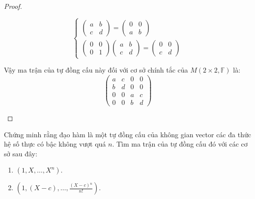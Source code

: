 \documentclass[class=linearalgebra,crop=false]{standalone}
\begin{document}
\begin{proof}
\begin{enumerate}[label = (\alph*)]
\[\begin{cases}
\begin{pmatrix}
                        a & b \\
                        c & d
                    \end{pmatrix}=
                    \begin{pmatrix}
                        0 & 0 \\
                        a & b
                    \end{pmatrix} \\
                    \begin{pmatrix}
                        0 & 0 \\
                        0 & 1
                    \end{pmatrix}
                    \begin{pmatrix}
                        a & b \\
                        c & d
                    \end{pmatrix}=
                    \begin{pmatrix}
                        0 & 0 \\
                        c & d
                    \end{pmatrix}
                \end{cases}
            \]
            \par Vậy ma trận của tự đồng cấu này đối với cơ sở chính tắc của $M(2\times 2,\mathbb{F})$ là:
            \[
                \begin{pmatrix}
                    a & c & 0 & 0 \\
                    b & d & 0 & 0 \\
                    0 & 0 & a & c \\
                    0 & 0 & b & d
                \end{pmatrix}
            \]
    \end{enumerate}
\end{proof}

\begin{exercise}
    Chứng minh rằng đạo hàm là một tự đồng cấu của không gian vector các đa thức hệ số thực có bậc không vượt quá $n$. Tìm ma trận của tự đồng cấu đó với các cơ sở sau đây:
    \begin{enumerate}[label = (\alph*)]
        \item $(1, X, \ldots, X^{n})$.
        \item $(1, (X-c), \ldots, \frac{(X-c){}^{n}}{n!})$.
    \end{enumerate}
\end{exercise}
\end{document}
